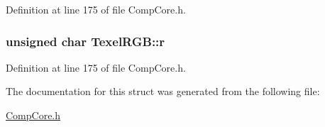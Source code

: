 Definition at line 175 of file Comp\-Core.\-h.

\hypertarget{struct_texel_r_g_b_ad62f973f1db93f3c02e5288ec0fb32c8}{
\subsubsection[{r}]{\setlength{\rightskip}{0pt plus 5cm}unsigned char Texel\-R\-G\-B\-::r}}\label{struct_texel_r_g_b_ad62f973f1db93f3c02e5288ec0fb32c8}


Definition at line 175 of file Comp\-Core.\-h.



The documentation for this struct was generated from the following file\-:\begin{DoxyCompactItemize}
\item 
\hyperlink{_comp_core_8h}{Comp\-Core.\-h}\end{DoxyCompactItemize}
